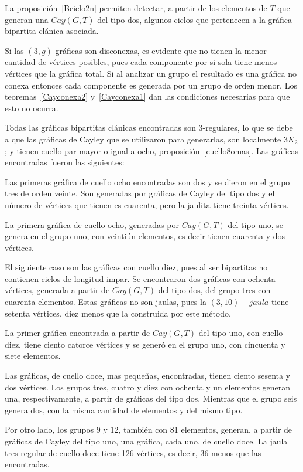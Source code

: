 \documentclass[11pt]{book}
\theoremstyle{definition}
\begin{document}
La proposición~\ref{Bciclo2n} permiten detectar, a partir de los
elementos de $T$ que generan una $Cay(G,T)$ del tipo dos, algunos
ciclos que pertenecen a la gráfica bipartita clánica asociada.


Si las $(3,g)$-gráficas son disconexas, es evidente que no tienen la
menor cantidad de vértices posibles, pues cada componente por si sola
tiene menos vértices que la gráfica total. Si al analizar un grupo el
resultado es una gráfica no conexa entonces cada componente es
generada por un grupo de orden menor. Los teoremas~\ref{Cayconexa2}
y~\ref{Cayconexa1} dan las condiciones necesarias para que esto no
ocurra.


Todas las gráficas bipartitas clánicas encontradas son $3$-regulares,
lo que se debe a que las gráficas de Cayley que se utilizaron para
generarlas, son localmente $3K_2$; y tienen cuello par mayor o igual a
ocho, proposición~\ref{cuello8omas}.  Las gráficas encontradas fueron
las siguientes:

Las primeras gráfica de cuello ocho encontradas son dos y se dieron en
el grupo tres de orden veinte. Son generadas por gráficas de Cayley
del tipo dos y el n\'umero de vértices que tienen es cuarenta, pero la
jaulita tiene treinta vértices.

La primera gráfica de cuello ocho, generadas por $Cay(G,T)$ del tipo
uno, se genera en el grupo uno, con veintiún elementos, es decir
tienen cuarenta y dos vértices.

El siguiente caso son las gráficas con cuello diez, pues al ser
bipartitas no contienen ciclos de longitud impar. Se encontraron dos
gráficas con ochenta vértices, generada a partir de $Cay(G,T)$ del
tipo dos, del grupo tres con cuarenta elementos. Estas gráficas no son
jaulas, pues la $(3,10)-jaula$ tiene setenta vértices, diez menos que
la construida por este método.
  
La primer gráfica encontrada a partir de $Cay(G,T)$ del tipo uno, con
cuello diez, tiene ciento catorce vértices y se generó en el grupo
uno, con cincuenta y siete elementos.


Las gráficas, de cuello doce, mas pequeñas, encontradas, tienen ciento
sesenta y dos vértices. Los grupos tres, cuatro y diez con ochenta y
un elementos generan una, respectivamente, a partir de gráficas del
tipo dos. Mientras que el grupo seis genera dos, con la misma cantidad
de elementos y del mismo tipo.

Por otro lado, los grupos 9 y 12, también con 81
elementos, generan, a partir de gráficas de Cayley del tipo uno, una
gráfica, cada uno, de cuello doce. La jaula tres regular de cuello
doce tiene 126 vértices, es decir, 36 menos
que las encontradas.
\end{document}
